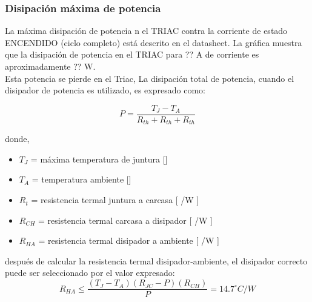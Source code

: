         \subsubsection*{Disipación máxima de potencia}
            La máxima disipación de potencia n el TRIAC contra la corriente de estado ENCENDIDO (ciclo completo) está descrito en el datasheet. La gráfica muestra que la disipación de potencia en el TRIAC para ?? A de corriente es aproximadamente ?? W.\\
            
            Esta potencia se pierde en el Triac, La disipación total de potencia, cuando el disipador de potencia es utilizado, es expresado como:
            
            \begin{equation}
                P   =   \frac{ T_{J} - T_{A} }{ R_{th} + R_{th} + R_{th} }
            \end{equation}
            
            donde,\\
            \begin{itemize}
                \item { $T_J$ = máxima temperatura de juntura [\dgC] }
                \item { $T_A$ = temperatura ambiente [\dgC] }
                \item { $R_t$ = resistencia termal juntura a carcasa [ \dgC/W ] }
                \item { $R_{CH}$ = resistencia termal carcasa a disipador [ \dgC/W ] }
                \item { $R_{HA}$ = resistencia termal disipador a ambiente [ \dgC/W ] }
            \end{itemize}
            
            después de calcular la resistencia termal disipador-ambiente, el disipador correcto puede ser seleccionado por el valor expresado:\\
            
            \begin{equation}
                R_{HA} \leq   \frac{ (T_J - T_A)(R_{JC}-P)(R_{CH}) }{ P } =   14.7^{\circ}C/W
            \end{equation}
